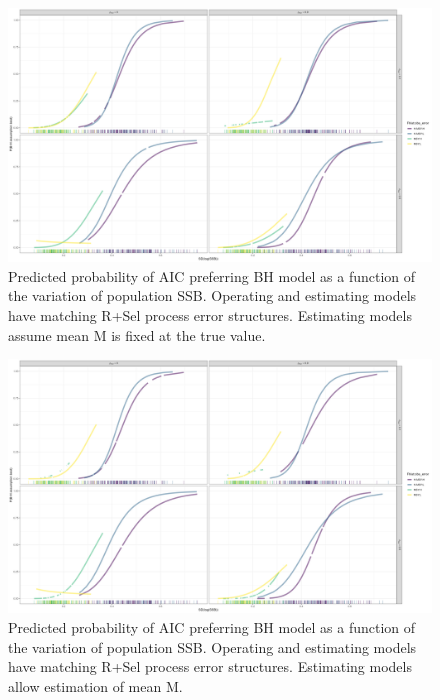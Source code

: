 \documentclass[
  12pt,
]{article}
\begin{document}
\begin{figure}
\caption{Predicted probability of AIC preferring BH model as a function of the variation of population SSB. Operating and estimating models have matching R+Sel process error structures. Estimating models assume mean M is fixed at the true value.}\label{Sel_om_MF_BH_glm_AIC_plots}
\begin{center}
\includegraphics[width = \textwidth]{Sel_om_MF_pred_BH_best.png}
\end{center}
\end{figure}

\begin{figure}
\caption{Predicted probability of AIC preferring BH model as a function of the variation of population SSB. Operating and estimating models have matching R+Sel process error structures. Estimating models allow estimation of mean M.}\label{Sel_om_ME_BH_glm_AIC_plots}
\begin{center}
\includegraphics[width = \textwidth]{Sel_om_ME_pred_BH_best.png}
\end{center}
\end{figure}
\end{document}
